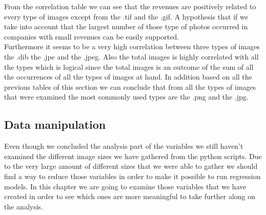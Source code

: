 \documentclass{book}
\begin{document}
From the correlation table we can see that the revenues are positively related to every type of images except from the .tif and the .gif. A hypothesis that if we take into account that the largest number of those type of photos occurred in companies with small revenues can be easily supported.\\
Furthermore it seems to be a very high correlation between three types of images the .dib the .jpe and the .jpeg. Also the total images is highly correlated with all the types which is logical since the total images is an outcome of the sum of all the occurrences of all the types of images at hand. In addition based on all the previous tables of this section we can conclude that from all the types of images that were examined the most commonly used types are the .png and the .jpg.
\subsection{Data manipulation}
Even though we concluded the analysis part of the variables we still haven't examined the different image sizes we have gathered from the python scripts. Due to the very large amount of different sizes that we were able to gather we should find a way to reduce those variables in order to make it possible to run regression models. In this chapter we are going to examine those variables that we have created in order to see which ones are more meaningful to take further along on the analysis.
\end{document}
